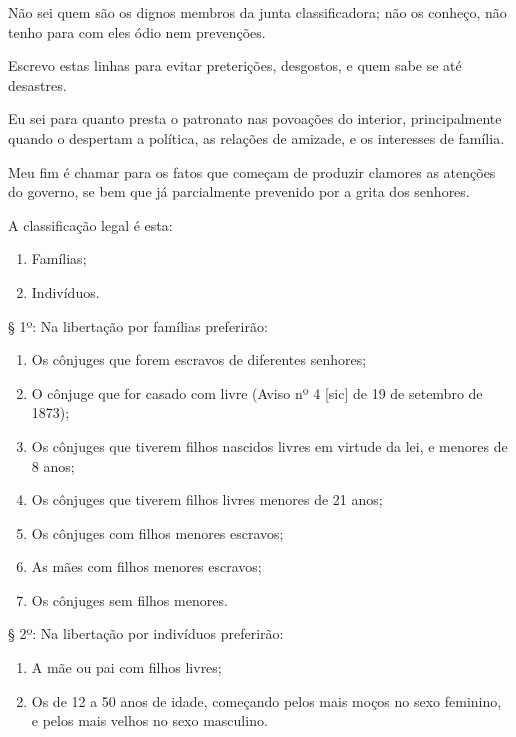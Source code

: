 Não sei quem são os dignos membros da junta classificadora; não os
conheço, não tenho para com eles ódio nem prevenções.

Escrevo estas linhas para evitar preterições, desgostos, e quem sabe se
até desastres.

Eu sei para quanto presta o patronato nas povoações do interior,
principalmente quando o despertam a política, as relações de amizade, e
os interesses de família.

Meu fim é chamar para os fatos que começam de produzir clamores as
atenções do governo, se bem que já parcialmente prevenido por a grita
dos senhores.

A classificação legal é esta:

\begin{enumerate}[label={\scshape\roman*.}]
\item Famílias;

\item Indivíduos.
\end{enumerate}

§ 1º: Na libertação por famílias preferirão:
\begin{enumerate}[label={\scshape\roman*.}]
\item Os cônjuges que forem escravos de diferentes senhores;

\item O cônjuge que for casado com livre (Aviso nº 4 {[}sic{]} de 19
de setembro de 1873);

\item Os cônjuges que tiverem filhos nascidos livres em virtude da lei, e
menores de 8 anos;

\item Os cônjuges que tiverem filhos livres menores de 21 anos;

\item Os cônjuges com filhos menores escravos;

\item As mães com filhos menores escravos;

\item Os cônjuges sem filhos menores.
\end{enumerate}

§ 2º: Na libertação por indivíduos preferirão:

\begin{enumerate}[label={\scshape\roman*.}]
\item A mãe ou pai com filhos livres;

\item Os de 12 a 50 anos de idade, começando pelos mais moços no sexo
feminino, e pelos mais velhos no sexo masculino.
\end{enumerate}

